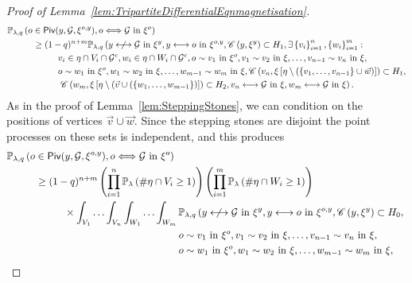 \documentclass[10pt,a4paper,dvipsnames]{article}
\theoremstyle{definition}
\theoremstyle{remark}
\newcommand{\pla}{\mathbb P_\lambda}
\newcommand{\plaq}{\mathbb{P}_{\lambda,q}}
\newcommand{\C}{\mathscr {C}}
\newcommand{\piv}[1]{\mathsf {Piv}(#1)}
\newcommand{\Gcal}{\mathcal{G}}
\newcommand{\conn}[3]{#1 \longleftrightarrow #2\textrm { in } #3}
\newcommand{\adja}[3]{#1 \sim #2\textrm { in } #3}
\newcommand{\nconn}[3]{#1 \centernot\longleftrightarrow #2\textrm { in } #3}
\newcommand{\dconn}[3]{#1 \Longleftrightarrow #2\textrm { in } #3}
\newcommand{\orig}{o}
\numberwithin{equation}{section}
\begin{document}
\begin{proof}[Proof of Lemma~\ref{lem:TripartiteDifferentialEqnmagnetisation}]
\begin{align}
        &\plaq\left(\orig\in\piv{y,\Gcal,\xi^{\orig, y}}, \dconn{\orig}{\Gcal}{\xi^\orig}\right) \nonumber\\
        &\hspace{1cm} \geq (1-q)^{n+m}\plaq\left(\nconn{y}{\Gcal}{\xi^y},\conn{y}{\orig}{\xi^{\orig,y}},
        \C\left(y,\xi^y\right)\subset H_1,\exists \left\{v_i\right\}_{i=1}^n, \left\{w_i\right\}_{i=1}^m\colon \right.\nonumber\\
        &\hspace{2cm}v_i\in\eta\cap V_i\cap \Gcal^c,w_i\in\eta\cap W_i\cap\Gcal^c,\adja{\orig}{v_1}{\xi^\orig},\adja{v_{1}}{v_2}{\xi},\ldots,\adja{v_{n-1}}{v_n}{\xi},\nonumber\\
        &\hspace{2cm}\adja{\orig}{w_1}{\xi^\orig},\adja{w_{1}}{w_2}{\xi},\ldots,\adja{w_{m-1}}{w_m}{\xi},\C\left(v_n,\xi\left[\eta\setminus\left(\left\{v_1,\ldots,v_{n-1}\right\}\cup\vec{w}\right)\right]\right)\subset H_1,\nonumber\\
        &\hspace{2cm}\left. \C\left(w_m,\xi\left[\eta\setminus\left(\vec{v}\cup(\left\{w_1,\ldots,w_{m-1}\right\}\right)\right]\right)\subset H_2,\conn{v_n}{\Gcal}{\xi}, \conn{w_m}{\Gcal}{\xi}\right).
    \end{align}
    As in the proof of Lemma~\ref{lem:SteppingStones}, we can condition on the positions of vertices $\vec{v}\cup\vec{w}$. Since the stepping stones are disjoint the point processes on these sets is independent, and this produces
    \begin{align}
        &\plaq\left(\orig\in\piv{y,\Gcal,\xi^{\orig, y}}, \dconn{\orig}{\Gcal}{\xi^\orig}\right) \nonumber\\
        &\hspace{1cm} \geq (1-q)^{n+m}\left(\prod^n_{i=1}\pla\left(\#\eta\cap V_i\geq 1\right)\right)\left(\prod^m_{i=1}\pla\left(\#\eta\cap W_i\geq 1\right)\right)\nonumber\\
        &\hspace{2cm} \times \int_{V_1}\ldots\int_{V_n}\int_{W_1}\ldots\int_{W_m}  \plaq\left(\nconn{y}{\Gcal}{\xi^y},\conn{y}{\orig}{\xi^{\orig,y}},
        \C\left(y,\xi^y\right)\subset H_0,\right.\nonumber\\
        &\hspace{6cm} \adja{\orig}{v_1}{\xi^\orig},\adja{v_{1}}{v_2}{\xi},\ldots,\adja{v_{n-1}}{v_n}{\xi},\nonumber\\
        &\hspace{6cm}\adja{\orig}{w_1}{\xi^\orig},\adja{w_{1}}{w_2}{\xi},\ldots,\adja{w_{m-1}}{w_m}{\xi},\nonumber\\

\end{align}
\end{proof}
\end{document}
